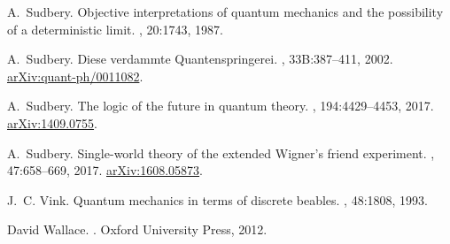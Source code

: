 \documentclass[12pt,reqno]{article}
\renewcommand{\(}{\left(}
\renewcommand{\)}{\right)}
\renewcommand{\.}{\centerdot}
\newcommand{\1}{\mathbf{1}}
\newcommand{\<}{\langle}
\renewcommand{\>}{\rangle}
\theoremstyle{definition}
\theoremstyle{remark}
\numberwithin{equation}{section}
\begin{document}
\begin{thebibliography}{10}
A.~Sudbery.
\newblock Objective interpretations of quantum mechanics and the possibility of
  a deterministic limit.
, 20:1743, 1987.

A.~Sudbery.
\newblock Diese verdammte {Q}uantenspringerei.
, 33B:387--411, 2002.
\newblock
  \href{https://arxiv.org/abs/quant-ph/0011082}{arXiv:quant-ph/0011082}.

A.~Sudbery.
\newblock The logic of the future in quantum theory.
, 194:4429--4453, 2017.
\newblock \href{https://arxiv.org/abs/1409.0755}{arXiv:1409.0755}.

A.~Sudbery.
\newblock Single-world theory of the extended {W}igner's friend experiment.
, 47:658--669, 2017.
\newblock \href{https://arxiv.org/abs/1608.05873}{arXiv:1608.05873}.

J.~C. Vink.
\newblock Quantum mechanics in terms of discrete beables.
, 48:1808, 1993.

David Wallace.
.
\newblock Oxford University Press, 2012.

\end{thebibliography}
\end{document}
